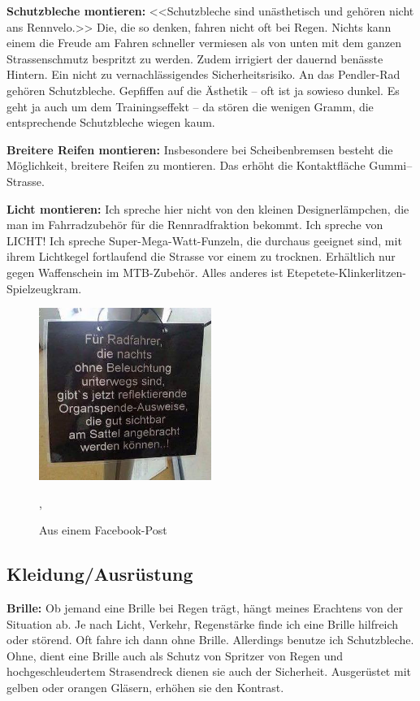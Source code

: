 \textbf{Schutzbleche montieren:}
<<Schutzbleche sind unästhetisch und gehören nicht ans Rennvelo.>>
Die, die so denken, fahren nicht oft bei Regen.
Nichts kann einem die Freude am Fahren schneller vermiesen als von unten mit dem ganzen Strassenschmutz bespritzt zu werden.
Zudem irrigiert der dauernd benässte Hintern. Ein nicht zu vernachlässigendes Sicherheitsrisiko.
An das Pendler-Rad gehören Schutzbleche.
Gepfiffen auf die Ästhetik -- oft ist ja sowieso dunkel.
Es geht ja auch um dem Trainingseffekt -- da stören die wenigen Gramm, die entsprechende Schutzbleche wiegen kaum.

\textbf{Breitere Reifen montieren:} 
Insbesondere bei Scheibenbremsen besteht die Möglichkeit, breitere Reifen zu montieren.
Das erhöht die Kontaktfläche Gummi--Strasse.

\textbf{Licht montieren:}
Ich spreche hier nicht von den kleinen Designerlämpchen, die man im Fahrradzubehör für die Rennradfraktion bekommt.
Ich spreche von LICHT!
Ich spreche Super-Mega-Watt-Funzeln, die durchaus geeignet sind, mit ihrem Lichtkegel fortlaufend die Strasse vor einem zu trocknen.
Erhältlich nur gegen Waffenschein im MTB-Zubehör.
Alles anderes ist Etepetete-Klinkerlitzen-Spielzeugkram.

\begin{figure}[htpb]
  \centering
  \includegraphics[width=0.5\textwidth]{figures/ohne-beleuchtung.jpg}
  \caption{Aus einem Facebook-Post \protect\cite{officepony2016organspendeausweis}},
  \label{fig:ohne-beleuchtung}
\end{figure}


\subsection{Kleidung/Ausrüstung}

\textbf{Brille:}
Ob jemand eine Brille bei Regen trägt, hängt meines Erachtens von der Situation ab.
Je nach Licht, Verkehr, Regenstärke finde ich eine Brille hilfreich oder störend.
Oft fahre ich dann ohne Brille.
Allerdings benutze ich Schutzbleche.
Ohne, dient eine Brille auch als Schutz von Spritzer von Regen und hochgeschleudertem Strasendreck dienen sie auch der Sicherheit.
Ausgerüstet mit gelben oder orangen Gläsern, erhöhen sie den Kontrast.

